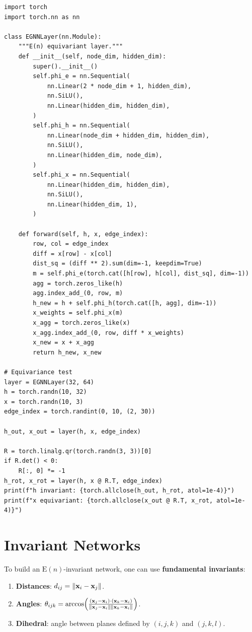 \begin{codeblock}[title=\textbf{EGNN implementation}]
\begin{verbatim}
import torch
import torch.nn as nn

class EGNNLayer(nn.Module):
    """E(n) equivariant layer."""
    def __init__(self, node_dim, hidden_dim):
        super().__init__()
        self.phi_e = nn.Sequential(
            nn.Linear(2 * node_dim + 1, hidden_dim),
            nn.SiLU(),
            nn.Linear(hidden_dim, hidden_dim),
        )
        self.phi_h = nn.Sequential(
            nn.Linear(node_dim + hidden_dim, hidden_dim),
            nn.SiLU(),
            nn.Linear(hidden_dim, node_dim),
        )
        self.phi_x = nn.Sequential(
            nn.Linear(hidden_dim, hidden_dim),
            nn.SiLU(),
            nn.Linear(hidden_dim, 1),
        )

    def forward(self, h, x, edge_index):
        row, col = edge_index
        diff = x[row] - x[col]
        dist_sq = (diff ** 2).sum(dim=-1, keepdim=True)
        m = self.phi_e(torch.cat([h[row], h[col], dist_sq], dim=-1))
        agg = torch.zeros_like(h)
        agg.index_add_(0, row, m)
        h_new = h + self.phi_h(torch.cat([h, agg], dim=-1))
        x_weights = self.phi_x(m)
        x_agg = torch.zeros_like(x)
        x_agg.index_add_(0, row, diff * x_weights)
        x_new = x + x_agg
        return h_new, x_new

# Equivariance test
layer = EGNNLayer(32, 64)
h = torch.randn(10, 32)
x = torch.randn(10, 3)
edge_index = torch.randint(0, 10, (2, 30))

h_out, x_out = layer(h, x, edge_index)

R = torch.linalg.qr(torch.randn(3, 3))[0]
if R.det() < 0:
    R[:, 0] *= -1
h_rot, x_rot = layer(h, x @ R.T, edge_index)
print(f"h invariant: {torch.allclose(h_out, h_rot, atol=1e-4)}")
print(f"x equivariant: {torch.allclose(x_out @ R.T, x_rot, atol=1e-4)}")
\end{verbatim}
\end{codeblock}

\section{Invariant Networks}

\begin{definition}
To build an $\mathrm{E}(n)$-invariant network, one can use
\textbf{fundamental invariants}:
\begin{enumerate}
    \item \textbf{Distances}: $d_{ij} = \left\| \mathbf{x}_i - \mathbf{x}_j \right\|$.
    \item \textbf{Angles}: $\theta_{ijk} = \arccos\!\left(\frac{(\mathbf{x}_j - \mathbf{x}_i) \cdot
          (\mathbf{x}_k - \mathbf{x}_i)}{\left\| \mathbf{x}_j - \mathbf{x}_i \right\|\left\| \mathbf{x}_k - \mathbf{x}_i \right\|}\right)$.
    \item \textbf{Dihedral}: angle between planes defined by $(i,j,k)$ and $(j,k,l)$.
\end{enumerate}
\end{definition}

